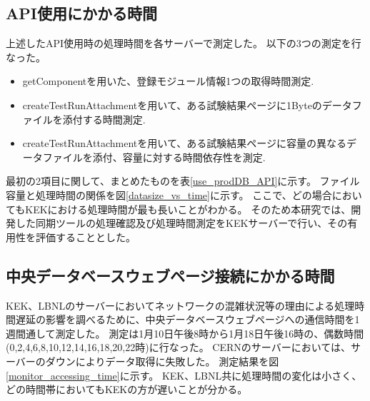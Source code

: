 \subsection{API使用にかかる時間}
上述したAPI使用時の処理時間を各サーバーで測定した。
以下の3つの測定を行なった。
\begin{itemize}
  \item getComponentを用いた、登録モジュール情報1つの取得時間測定.
  \item createTestRunAttachmentを用いて、ある試験結果ページに1Byteのデータファイルを添付する時間測定.
  \item createTestRunAttachmentを用いて、ある試験結果ページに容量の異なるデータファイルを添付、容量に対する時間依存性を測定.
\end{itemize}

最初の2項目に関して、まとめたものを表\ref{use_prodDB_API}に示す。
ファイル容量と処理時間の関係を図\ref{datasize_vs_time}に示す。
ここで、どの場合においてもKEKにおける処理時間が最も長いことがわかる。
そのため本研究では、開発した同期ツールの処理確認及び処理時間測定をKEKサーバーで行い、その有用性を評価することとした。

\subsection{中央データベースウェブページ接続にかかる時間}
KEK、LBNLのサーバーにおいてネットワークの混雑状況等の理由による処理時間遅延の影響を調べるために、中央データベースウェブページへの通信時間を1週間通して測定した。
測定は1月10日午後8時から1月18日午後16時の、偶数時間(0,2,4,6,8,10,12,14,16,18,20,22時)に行なった。
CERNのサーバーにおいては、サーバーのダウンによりデータ取得に失敗した。
測定結果を図\ref{monitor_accessing_time}に示す。
KEK、LBNL共に処理時間の変化は小さく、どの時間帯においてもKEKの方が遅いことが分かる。

